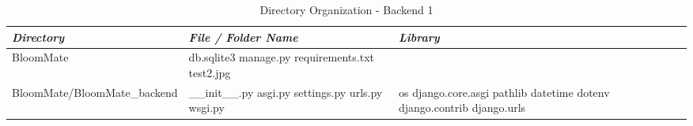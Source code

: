 \documentclass[conference, a4paper]{IEEEtran}
\begin{document}
\newpage
\begin{table} [htp]
    \caption{Directory Organization - Backend 1}
    \centering
    \renewcommand{\arraystretch}{1.3}
    \begin{tabular}{p{1.7cm}|p{2.8cm}|p{2.5cm}}
    \hline
    \textit{\textbf{Directory}} & \textit{\textbf{File / Folder Name}} & \textit{\textbf{Library}} \\
     \hline
 BloomMate &  db.sqlite3 \newline manage.py \newline requirements.txt \newline test2.jpg & \\
 \hline
 BloomMate\newline/BloomMate\_\newline backend & \_\_init\_\_.py \newline asgi.py \newline settings.py \newline urls.py \newline wsgi.py & os \newline django.core.asgi \newline pathlib \newline datetime \newline dotenv \newline django.contrib \newline django.urls \\
 \hline
    \end{tabular}
\end{table}

\newpage 
\end{document}
